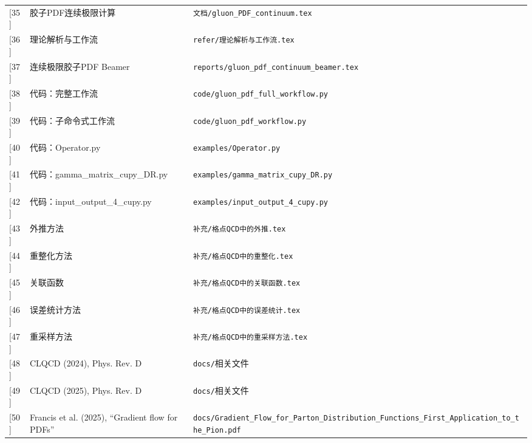 \documentclass[12pt,a4paper]{ctexart}
\theoremstyle{definition}
\begin{document}
\begin{longtable}{lp{6cm}p{5cm}}
[35] & 胶子PDF连续极限计算 & \texttt{文档/gluon\_PDF\_continuum.tex} \\

[36] & 理论解析与工作流 & \texttt{refer/理论解析与工作流.tex} \\

[37] & 连续极限胶子PDF Beamer & \texttt{reports/gluon\_pdf\_continuum\_beamer.tex} \\

[38] & 代码：完整工作流 & \texttt{code/gluon\_pdf\_full\_workflow.py} \\

[39] & 代码：子命令式工作流 & \texttt{code/gluon\_pdf\_workflow.py} \\

[40] & 代码：Operator.py & \texttt{examples/Operator.py} \\

[41] & 代码：gamma\_matrix\_cupy\_DR.py & \texttt{examples/gamma\_matrix\_cupy\_DR.py} \\

[42] & 代码：input\_output\_4\_cupy.py & \texttt{examples/input\_output\_4\_cupy.py} \\

[43] & 外推方法 & \texttt{补充/格点QCD中的外推.tex} \\

[44] & 重整化方法 & \texttt{补充/格点QCD中的重整化.tex} \\

[45] & 关联函数 & \texttt{补充/格点QCD中的关联函数.tex} \\

[46] & 误差统计方法 & \texttt{补充/格点QCD中的误差统计.tex} \\

[47] & 重采样方法 & \texttt{补充/格点QCD中的重采样方法.tex} \\

[48] & CLQCD (2024), Phys. Rev. D & \texttt{docs/}相关文件 \\

[49] & CLQCD (2025), Phys. Rev. D & \texttt{docs/}相关文件 \\

[50] & Francis et al. (2025), ``Gradient flow for PDFs'' & \texttt{docs/Gradient\_Flow\_for\_Parton\_Distribution\_Functions\_First\_Application\_to\_the\_Pion.pdf} \\
\end{longtable}

\end{document}
